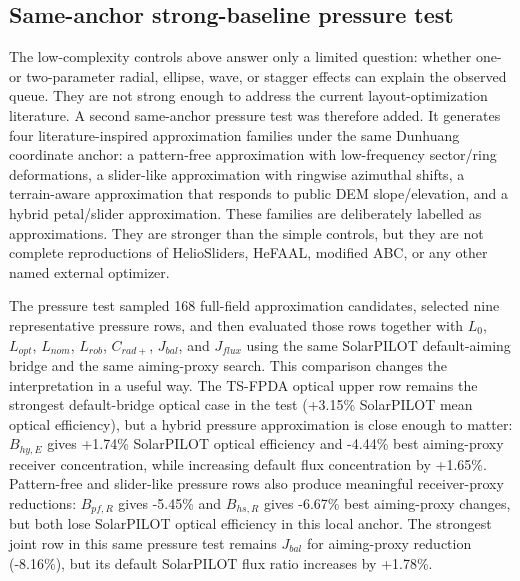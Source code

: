 \documentclass[final,3p,times]{elsarticle}
\begin{document}
\subsection{Same-anchor strong-baseline pressure test}
The low-complexity controls above answer only a limited question: whether one- or two-parameter radial, ellipse, wave, or stagger effects can explain the observed queue. They are not strong enough to address the current layout-optimization literature. A second same-anchor pressure test was therefore added. It generates four literature-inspired approximation families under the same Dunhuang coordinate anchor: a pattern-free approximation with low-frequency sector/ring deformations, a slider-like approximation with ringwise azimuthal shifts, a terrain-aware approximation that responds to public DEM slope/elevation, and a hybrid petal/slider approximation. These families are deliberately labelled as approximations. They are stronger than the simple controls, but they are not complete reproductions of HelioSliders, HeFAAL, modified ABC, or any other named external optimizer.

The pressure test sampled 168 full-field approximation candidates, selected nine representative pressure rows, and then evaluated those rows together with $L_0$, $L_{opt}$, $L_{nom}$, $L_{rob}$, $C_{rad+}$, $J_{bal}$, and $J_{flux}$ using the same SolarPILOT default-aiming bridge and the same aiming-proxy search. This comparison changes the interpretation in a useful way. The TS-FPDA optical upper row remains the strongest default-bridge optical case in the test (+3.15\% SolarPILOT mean optical efficiency), but a hybrid pressure approximation is close enough to matter: $B_{hy,E}$ gives +1.74\% SolarPILOT optical efficiency and -4.44\% best aiming-proxy receiver concentration, while increasing default flux concentration by +1.65\%. Pattern-free and slider-like pressure rows also produce meaningful receiver-proxy reductions: $B_{pf,R}$ gives -5.45\% and $B_{hs,R}$ gives -6.67\% best aiming-proxy changes, but both lose SolarPILOT optical efficiency in this local anchor. The strongest joint row in this same pressure test remains $J_{bal}$ for aiming-proxy reduction (-8.16\%), but its default SolarPILOT flux ratio increases by +1.78\%.
\end{document}
